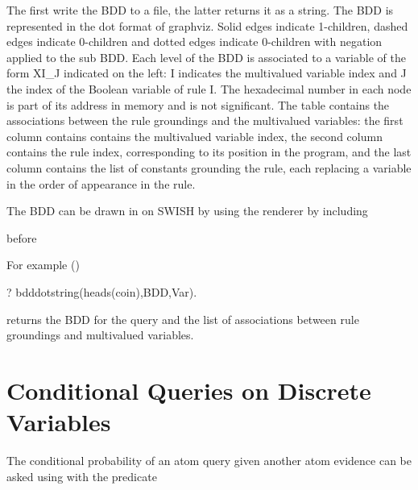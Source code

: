 \documentclass[letterpaper,10pt,english]{sphinxmanual}
\begin{document}
The first write the BDD to a file, the latter returns it as a string.
The BDD is represented in the dot format of graphviz.
Solid edges indicate 1-children, dashed edges indicate 0-children and dotted edges indicate 0-children
with negation applied to the sub BDD.
Each level of the BDD is associated to a variable of the form XI\_J indicated on the left: I indicates the multivalued variable index and J the index of the Boolean variable of rule I.
The hexadecimal number in each node is part of its address in memory and is not significant.
The table  contains the associations between the rule groundings and the multivalued variables: the first column contains contains the multivalued variable index, the second column contains the rule index, corresponding to its position in the program, and the last column contains the list of constants grounding the rule, each replacing a variable in the order of appearance in the rule.

The BDD can be drawn in  on SWISH by using the  renderer by including

\begin{sphinxVerbatim}[commandchars=\\\{\}]
 
\end{sphinxVerbatim}

before 

For example ()

\begin{sphinxVerbatim}[commandchars=\\\{\}]
?\PYGZhy{} bdd\PYGZus{}dot\PYGZus{}string(heads(coin),BDD,Var).
\end{sphinxVerbatim}

returns the BDD for the query  and the list of associations between rule groundings
and multivalued variables.


\section{Conditional Queries on Discrete Variables}
\label{\detokenize{index:conditional-queries-on-discrete-variables}}
The conditional probability of an atom query given another atom evidence can be asked using 
with the predicate
\end{document}
